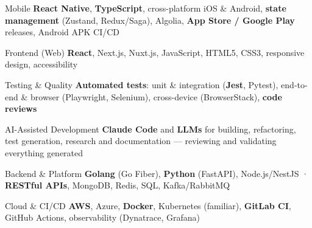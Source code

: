 
\begin{cvskills}

  \cvskill
  {Mobile}
  {\textbf{React Native}, \textbf{TypeScript}, cross-platform iOS \& Android, \textbf{state management} (Zustand, Redux/Saga), Algolia, \textbf{App Store / Google Play} releases, Android APK CI/CD}

  \cvskill
  {Frontend (Web)}
  {\textbf{React}, Next.js, Nuxt.js, JavaScript, HTML5, CSS3, responsive design, accessibility}

  \cvskill
  {Testing \& Quality}
  {\textbf{Automated tests}: unit \& integration (\textbf{Jest}, Pytest), end-to-end \& browser (Playwright, Selenium), cross-device (BrowserStack), \textbf{code reviews}}

  \cvskill
  {AI-Assisted Development}
  {\textbf{Claude Code} and \textbf{LLMs} for building, refactoring, test generation, research and documentation --- reviewing and validating everything generated}

  \cvskill
  {Backend \& Platform}
  {\textbf{Golang} (Go Fiber), \textbf{Python} (FastAPI), Node.js/NestJS · \textbf{RESTful APIs}, MongoDB, Redis, SQL, Kafka/RabbitMQ}

  \cvskill
  {Cloud \& CI/CD}
  {\textbf{AWS}, Azure, \textbf{Docker}, Kubernetes (familiar), \textbf{GitLab CI}, GitHub Actions, observability (Dynatrace, Grafana)}

\end{cvskills}
